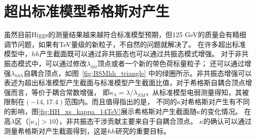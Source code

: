 \section{超出标准模型希格斯对产生}
虽然目前Higgs的测量结果越来越符合标准模型预期，但125 GeV的质量会有精细调节问题\cite{}，如果有TeV量级的新粒子，不自然的问题就解决了。
在许多超出标准模型中，$hh$产生截面既可以通过非共振态也可以通过共振态模式增强。
对于非共振态模式中，可以通过修改$\lambda_{h\bar{t}t}$顶点\cite{Grober:2010yv,Contino:2012xk}或者一个新的带色荷标量粒子\cite{Kribs:2012kz}；
还可以通过增强$\lambda_{hhh}$自耦合顶点，如图~\ref{fig:BSMhh_triangle}
中的绿圈所示。非共振态增强可以表述为超出标准模型产生截面与标准模型产生截面比值，对于希格斯自耦合顶点增强而言，等价于耦合常数增强，
即$\kappa_{\lambda}=\lambda/\lambda_{SM}$，从标准模型电弱测量得知，其被限制在$(-14, 17.4)$\cite{Kribs:2017znd}范围内。而且值得指出的是，
不同的$\kappa$对希格斯对产生有不同的影响\cite{Frederix:2014hta}，图\ref{fig:HH_xs_kappa_14TeV}展示希格斯对产生截面随$\kappa$的变化情况。
在高$\lambda$区（$|\kappa_{\lambda}|>10$），非共振态干涉贡献主要来自于自耦合顶点。
$\kappa$的确认可以通过测量希格斯对产生截面得到，这是$hh$研究的重要目标。
